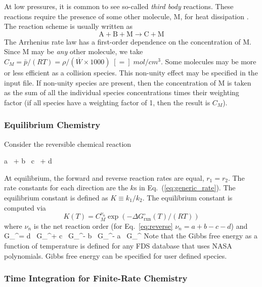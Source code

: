 At low pressures, it is common to see so-called \emph{third body} reactions.  These reactions require the presence of some other molecule, M, for heat dissipation \cite{Turns:1996}.  The reaction scheme is usually written as
\begin{equation}\label{eq:third_body}
\mathrm{A} + \mathrm{B} + \mathrm{M} \rightarrow \mathrm{C} + \mathrm{M}
\end{equation}
The Arrhenius rate law has a first-order dependence on the concentration of M.  Since M may be \emph{any} other molecule, we take $C_{\si{M}} = \bar{p}/(R T) = \rho/(\overline{W} \times 1000) \;[=]\;\si{mol/cm^3}$. Some molecules may be more or less efficient as a collision species. This non-unity effect may be specified in the input file. If non-unity species are present, then the concentration of M is taken as the sum of all the individual species concentrations times their weighting factor (if all species have a weighting factor of 1, then the result is $C_{\si{M}}$).

\subsubsection{Equilibrium Chemistry}
\label{sec:equilChem}

Consider the reversible chemical reaction

\be
a \,  + b \,   c \,  + d \, 
\label{eq:reverse}
\ee

\noindent At equilibrium, the forward and reverse reaction rates are equal, $r_{1} = r_{2}$.  The rate constants for each direction are the $k$s in Eq.~(\ref{eq:generic_rate}).  The equilibrium constant is defined as $K \equiv k_{1}/k_{2}$.  The equilibrium constant is computed via
\begin{equation}\label{eq:equilibrium_const}
K(T) = C_{\si{M}}^{\nu_n} \exp(-\Delta G_{\mathrm{rxn}}^\circ(T)/(RT))
\end{equation}
where $\nu_n$ is the net reaction order (for Eq.~\ref{eq:reverse} $\nu_n = a + b - c - d$) and
\be                                                               
G_{}^\circ = d \, G_^\circ + c \, G_^\circ - b \, G_^\circ - a \, G_^\circ
\ee
Note that the Gibbs free energy as a function of temperature is defined for any FDS database that uses NASA polynomials.  Gibbs free energy can be specified for user defined species.

\subsubsection{Time Integration for Finite-Rate Chemistry}

